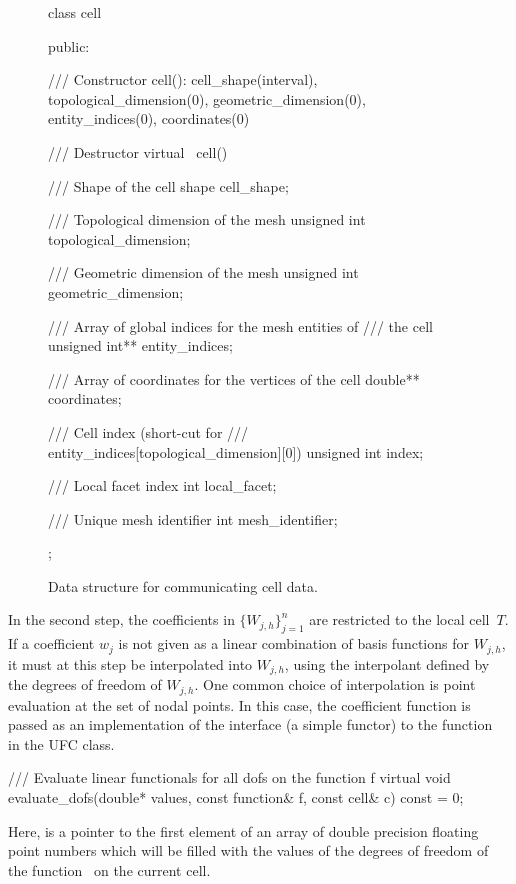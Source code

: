 \begin{figure}
\bwfig
\begin{c++}
class cell
{
public:

  /// Constructor
  cell(): cell_shape(interval),
          topological_dimension(0), geometric_dimension(0),
          entity_indices(0), coordinates(0) {}

  /// Destructor
  virtual ~cell() {}

  /// Shape of the cell
  shape cell_shape;

  /// Topological dimension of the mesh
  unsigned int topological_dimension;

  /// Geometric dimension of the mesh
  unsigned int geometric_dimension;

  /// Array of global indices for the mesh entities of
  /// the cell
  unsigned int** entity_indices;

  /// Array of coordinates for the vertices of the cell
  double** coordinates;

  /// Cell index (short-cut for
  /// entity_indices[topological_dimension][0])
  unsigned int index;

  /// Local facet index
  int local_facet;

  /// Unique mesh identifier
  int mesh_identifier;

};
\end{c++}
\caption{Data structure for communicating cell data.}
\label{fig:cellcode}
\end{figure}

In the second step, the coefficients in $\{W_{j,h}\}_{j=1}^n$ are
restricted to the local cell~$T$. If a coefficient $w_j$ is not given
as a linear combination of basis functions for $W_{j,h}$, it must at
this step be interpolated into $W_{j,h}$, using the interpolant
defined by the degrees of freedom of $W_{j,h}$. One common choice of
interpolation is point evaluation at the set of nodal points. In this
case, the coefficient function is passed as an implementation of the
 interface (a simple functor) to the
function~ in the UFC  class.

\begin{c++}
/// Evaluate linear functionals for all dofs on the function f
virtual void evaluate_dofs(double* values,
                           const function& f,
                           const cell& c) const = 0;
\end{c++}
Here,  is a pointer to the first element of an
array of double precision floating point numbers which will be filled
with the values of the degrees of freedom of the function~ on
the current cell.

